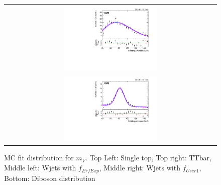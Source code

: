 \begin{figure}[!htbp]
\begin{tabular}{c}
	 \includegraphics[width=0.45\textwidth]{Plots/BackgroundEstimation/WV/m_j_fitting/_WJets0_xwwWWTree_VJets_User1_with_pull.pdf}\\
	 \includegraphics[width=0.45\textwidth]{Plots/BackgroundEstimation/WV/m_j_fitting/_VV_xwwWWTree_VV_EWK_QCD_ExpGaus_with_pull.pdf}\\
	 \end{tabular}
	 \caption{MC fit distribution for $m_{V}$. Top Left: Single top, Top right: TTbar, Middle left: Wjets with $f_{ErfExp}$, Middle right: Wjets with $f_{User1}$, Bottom: Diboson distribution }
	 \label{fig:mW_1}
\end{figure}
